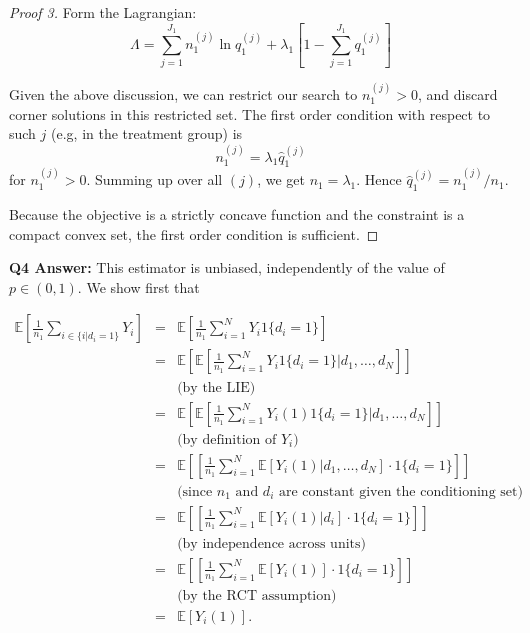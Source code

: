 \documentclass[11pt]{article} %
\begin{document}
\begin{proof}[Proof 3]

  Form the Lagrangian:
  \[ \Lambda  =  \sum_{j=1}^{J_1} n_1^{(j)} \ln q_1^{(j)} + \lambda_1 \left[1 -
      \sum_{j=1}^{J_1} q_1^{(j)}\right] \]

  Given the above discussion, we can restrict our search to $n_1^{(j)}>0$, and
  discard corner solutions in this restricted set. The
  first order condition with respect to such $j$ (e.g,  in the treatment group) is
  \[ n_1^{(j)} = \lambda_1 \hat q_1^{(j)}\]
  for $n_1^{(j)} > 0$. Summing up over all $(j)$, we get $n_1 = \lambda_1$. Hence $ \hat q_1^{(j)} = n_1^{(j)} / n_1$. 

  Because the objective is a strictly concave function and the constraint is a
  compact convex set, the first order condition is sufficient.
\end{proof}


\textbf{Q4 Answer:} This estimator is unbiased, independently of the value of $p \in (0,1)$. We show first that 

\begin{eqnarray*}
\mathbb{E} \left[ \frac{1}{n_1} \sum_{i \in \{ i | d_i =1 \}} Y_i  \right]  &=& \mathbb{E} \left[ \frac{1}{n_1} \sum_{i=1}^{N} Y_i 1\{d_i=1\}  \right]  \\
&=&\mathbb{E} \left[  \mathbb{E} \left[ \frac{1}{n_1} \sum_{i=1}^{N} Y_i 1\{d_i=1\}  | d_1, \ldots, d_N \right] \right] \\
&&\textrm{(by the LIE)} \\
&=& \mathbb{E} \left[  \mathbb{E} \left[ \frac{1}{n_1} \sum_{i=1}^{N} Y_{i}(1) 1\{d_i=1\}  | d_1, \ldots, d_N \right] \right] \\
&& \textrm{(by definition of $Y_i$)} \\ 
&=& \mathbb{E} \left[  \left[ \frac{1}{n_1} \sum_{i=1}^{N} \mathbb{E}[Y_{i}(1)  | d_1, \ldots, d_N  ] \cdot 1\{d_i=1\}  \right] \right] \\
&& \textrm{(since $n_1$ and $d_i$ are constant given the conditioning set)} \\
&=&\mathbb{E} \left[  \left[ \frac{1}{n_1} \sum_{i=1}^{N} \mathbb{E}[Y_{i}(1)  | d_i ] \cdot 1\{d_i=1\}  \right] \right] \\
&& \textrm{(by independence across units)} \\
&=& \mathbb{E} \left[  \left[ \frac{1}{n_1} \sum_{i=1}^{N} \mathbb{E}[Y_{i}(1) ] \cdot 1\{d_i=1\}  \right] \right] \\
&& \textrm{(by the RCT assumption)} \\
&=& \mathbb{E}[Y_i(1)].
\end{eqnarray*}
\end{document}
